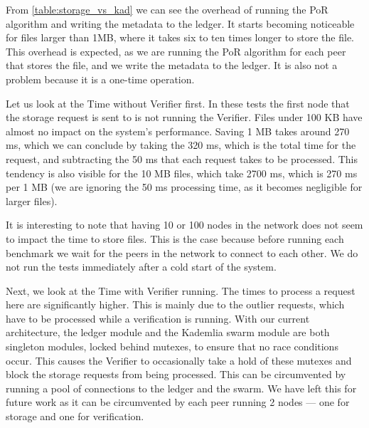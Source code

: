 From \autoref{table:storage_vs_kad} we can see the overhead of running the PoR algorithm and
writing the metadata to the ledger.
It starts becoming noticeable for files larger than 1MB, where it takes six to ten times longer
to store the file.
This overhead is expected, as we are running the PoR algorithm for each peer that stores the file,
and we write the metadata to the ledger.
It is also not a problem because it is a one-time operation.

Let us look at the Time without Verifier first.
In these tests the first node that the storage request is sent to is not running the Verifier.
Files under 100 KB have almost no impact on the system's performance.
Saving 1 MB takes around 270 ms, which we can conclude by taking the 320 ms, which is the total
time for the request, and subtracting the 50 ms that each request takes to be processed.
This tendency is also visible for the 10 MB files, which take 2700 ms, which is 270 ms per 1 MB
(we are ignoring the 50 ms processing time, as it becomes negligible for larger files).

It is interesting to note that having 10 or 100 nodes in the network does not seem to impact the
time to store files.
This is the case because before running each benchmark we wait for the peers in the network
to connect to each other.
We do not run the tests immediately after a cold start of the system.

Next, we look at the Time with Verifier running.
The times to process a request here are significantly higher.
This is mainly due to the outlier requests, which have to be processed while a verification is running.
With our current architecture, the ledger module and the Kademlia swarm module are both singleton modules,
locked behind mutexes, to ensure that no race conditions occur.
This causes the Verifier to occasionally take a hold of these mutexes and block the
storage requests from being processed.
This can be circumvented by running a pool of connections to the ledger and the swarm.
We have left this for future work as it can be circumvented by each peer running 2 nodes ---
one for storage and one for verification.

